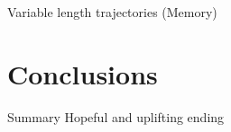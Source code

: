 \documentclass{acm_proc_article-sp}
\begin{document}
Variable length trajectories (Memory)

\section{Conclusions}
\label{sec:conclusions}
Summary
Hopeful and uplifting ending

%

%
%
\end{document}
